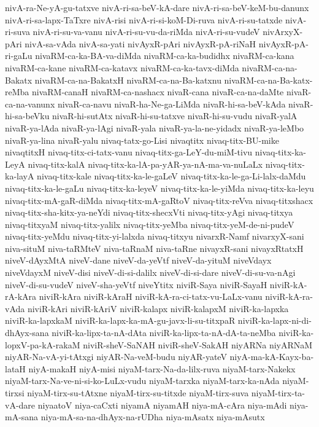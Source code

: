 {nivA-ra-Ne-yA-gu-tatxve
nivA-ri-sa-beV-kA-dare
nivA-ri-sa-beV-keM-bu-danunx
nivA-ri-sa-lapx-TaTxre
nivA-risi
nivA-ri-si-koM-Di-ruva
nivA-ri-su-tatxde
nivA-ri-suva
nivA-ri-su-va-vanu
nivA-ri-su-vu-da-riMda
nivA-ri-su-vudeV
nivArxyX-pAri
nivA-sa-vAda
nivA-sa-yati
nivAyxR-pAri
nivAyxR-pA-riNaH
nivAyxR-pA-ri-gaLu
nivaRM-ca-ka-BA-va-diMda
nivaRM-ca-ka-budidhx
nivaRM-ca-kana
nivaRM-ca-kane
nivaRM-ca-katavx
nivaRM-ca-ka-tavx-diMda
nivaRM-ca-na-Bakatx
nivaRM-ca-na-BakatxH
nivaRM-ca-na-Ba-katxnu
nivaRM-ca-na-Ba-katx-reMba
nivaRM-canaH
nivaRM-ca-nashacx
nivaR-cana
nivaR-ca-na-daMte
nivaR-ca-na-vanunx
nivaR-ca-navu
nivaR-ha-Ne-ga-LiMda
nivaR-hi-sa-beV-kAda
nivaR-hi-sa-beVku
nivaR-hi-sutAtx
nivaR-hi-su-tatxve
nivaR-hi-su-vudu
nivaR-yalA
nivaR-ya-lAda
nivaR-ya-lAgi
nivaR-yala
nivaR-ya-la-ne-yidadx
nivaR-ya-leMbo
nivaR-ya-lina
nivaR-yalu
nivaq-tatx-go-Lisi
nivaqtitx
nivaq-titx-BU-mike
nivaqtitxH
nivaq-titx-ci-tatx-vanu
nivaq-titx-ga-LeY-du-miM-tivu
nivaq-titx-ka-LeyA
nivaq-titx-kalA
nivaq-titx-ka-lA-pa-yAR-ya-nA-ma-va-nuLaLx
nivaq-titx-ka-layA
nivaq-titx-kale
nivaq-titx-ka-le-gaLeV
nivaq-titx-ka-le-ga-Li-lalx-daMdu
nivaq-titx-ka-le-gaLu
nivaq-titx-ka-leyeV
nivaq-titx-ka-le-yiMda
nivaq-titx-ka-leyu
nivaq-titx-mA-gaR-diMda
nivaq-titx-mA-gaRtoV
nivaq-titx-reVva
nivaq-titxshacx
nivaq-titx-sha-kitx-ya-neYdi
nivaq-titx-shecxVti
nivaq-titx-yAgi
nivaq-titxya
nivaq-titxyaM
nivaq-titx-yalilx
nivaq-titx-yeMba
nivaq-titx-yeM-de-ni-pudeV
nivaq-titx-yeMdu
nivaq-titx-yi-lalxda
nivaq-titxyu
nivarxR-Namf
nivarxyX-sani
niva-situM
niva-taRMteV
niva-taRnaM
niva-taRne
nivayxR-sani
nivayxRtatxH
niveV-dAyxMtA
niveV-dane
niveV-da-yeVtf
niveV-da-yituM
niveVdayx
niveVdayxM
niveV-disi
niveV-di-si-dalilx
niveV-di-si-dare
niveV-di-su-va-nAgi
niveV-di-su-vudeV
niveV-sha-yeVtf
niveYtitx
niviR-Saya
niviR-SayaH
niviR-kA-rA-kAra
niviR-kAra
niviR-kAraH
niviR-kA-ra-ci-tatx-vu-LaLx-vanu
niviR-kA-ra-vAda
niviR-kAri
niviR-kAriV
niviR-kalapx
niviR-kalapxM
niviR-ka-lapxka
niviR-ka-lapxkaM
niviR-ka-lapx-ka-mA-gu-javx-li-su-titxpaR
niviR-ka-lapx-ni-di-dhAyx-sana
niviR-ka-lipx-ta-nA-dAta
niviR-ka-lipx-ta-nA-dA-ta-neMba
niviR-ka-lopxV-pa-kA-rakaM
niviR-sheV-SaNAH
niviR-sheV-SakAH
niyARNa
niyARNaM
niyAR-Na-vA-yi-tAtxgi
niyAR-Na-veM-budu
niyAR-yateV
niyA-ma-kA-Kayx-ba-lataH
niyA-makaH
niyA-misi
niyaM-tarx-Na-da-lilx-ruva
niyaM-tarx-Nakekx
niyaM-tarx-Na-ve-ni-si-ko-LuLx-vudu
niyaM-tarxka
niyaM-tarx-ka-nAda
niyaM-tirxsi
niyaM-tirx-su-tAtxne
niyaM-tirx-su-titxde
niyaM-tirx-suva
niyaM-tirx-ta-vA-dare
niyaatoV
niya-caCxti
niyamA
niyamAH
niya-mA-cAra
niya-mAdi
niya-mA-sana
niya-mA-sa-na-dhAyx-na-rUDha
niya-mAsatx
niya-mAsutx
}
